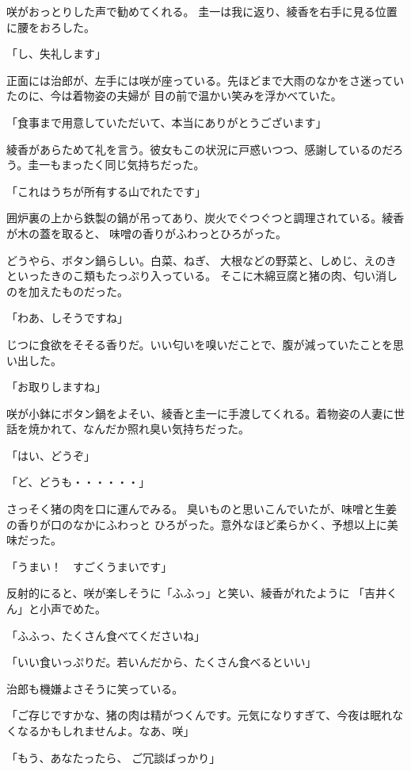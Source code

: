 ﻿\documentclass[book,tate]{jlreq}
\begin{document}
咲がおっとりした声で勧めてくれる。 圭一は我に返り、綾香を右手に見る位置に腰をおろした。

「し、失礼します」

正面には治郎が、左手には咲が座っている。先ほどまで大雨のなかをさ迷っていたのに、今は着物姿の夫婦が
目の前で温かい笑みを浮かべていた。

「食事まで用意していただいて、本当にありがとうございます」

綾香があらためて礼を言う。彼女もこの状況に戸惑いつつ、感謝しているのだろう。圭一もまったく同じ気持ちだった。

「これはうちが所有する山でれたです」

囲炉裏の上から鉄製の鍋が吊ってあり、炭火でぐつぐつと調理されている。綾香が木の蓋を取ると、
味噌の香りがふわっとひろがった。

どうやら、ボタン鍋らしい。白菜、ねぎ、 大根などの野菜と、しめじ、えのきといったきのこ類もたっぷり入っている。
そこに木綿豆腐と猪の肉、匂い消しのを加えたものだった。

「わあ、しそうですね」

じつに食欲をそそる香りだ。いい匂いを嗅いだことで、腹が減っていたことを思い出した。

「お取りしますね」

咲が小鉢にボタン鍋をよそい、綾香と圭一に手渡してくれる。着物姿の人妻に世話を焼かれて、なんだか照れ臭い気持ちだった。

「はい、どうぞ」

「ど、どうも・・・・・・」

さっそく猪の肉を口に運んでみる。 臭いものと思いこんでいたが、味噌と生姜の香りが口のなかにふわっと
ひろがった。意外なほど柔らかく、予想以上に美味だった。

「うまい！　すごくうまいです」

反射的にると、咲が楽しそうに「ふふっ」と笑い、綾香がれたように
「吉井くん」と小声でめた。

「ふふっ、たくさん食べてくださいね」

「いい食いっぷりだ。若いんだから、たくさん食べるといい」

治郎も機嫌よさそうに笑っている。

「ご存じですかな、猪の肉は精がつくんです。元気になりすぎて、今夜は眠れなくなるかもしれませんよ。なあ、咲」

「もう、あなたったら、 ご冗談ばっかり」
\end{document}
